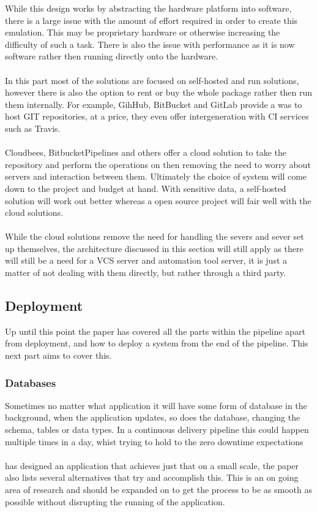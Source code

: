 While this design works by abstracting the hardware platform into software, there is a large issue with the amount of effort required in order to create this emulation. This may be proprietary hardware or otherwise increasing the difficulty of such a task. There is also the issue with performance as it is now software rather then running directly onto the hardware. 
\\\\
In this part most of the solutions are focused on self-hosted and run solutions, however there is also the option to rent or buy the whole package rather then run them internally. For example, GihHub, BitBucket and GitLab provide a was to host GIT repositories, at a price, they even offer intergeneration with CI services such as Travis. 
\\\\
Cloudbees, BitbucketPipelines and others offer a cloud solution to take the repository and perform the operations on then removing the need to worry about servers and interaction between them. Ultimately the choice of system will come down to the project and budget at hand. With sensitive data, a self-hosted solution will work out better whereas a open source project will fair well with the cloud solutions.
\\\\
While the cloud solutions remove the need for handling the severs and sever set up themselves, the architecture discussed in this section will still apply as there will still be a need for a VCS server and automation tool server, it is just a matter of not dealing with them directly, but rather through a third party.

\subsection{Deployment}
\label{sec:deployment}

Up until this point the paper has covered all the parts within the pipeline apart from deployment, and how to deploy a system from the end of the pipeline. This next part aims to cover this.

\subsubsection{Databases}
Sometimes no matter what application it will have some form of database in the background, when the application updates, so does the database, changing the schema, tables or data types. In a continuous delivery pipeline this could happen multiple times in a day, whist trying to hold to the zero downtime expectations
\\\\
\cite{updatedatabse} has designed an application that achieves just that on a small scale, the paper also lists several alternatives that try and accomplish this. This is an on going area of research and should be expanded on to get the process to be as smooth as possible without disrupting the running of the application.  

